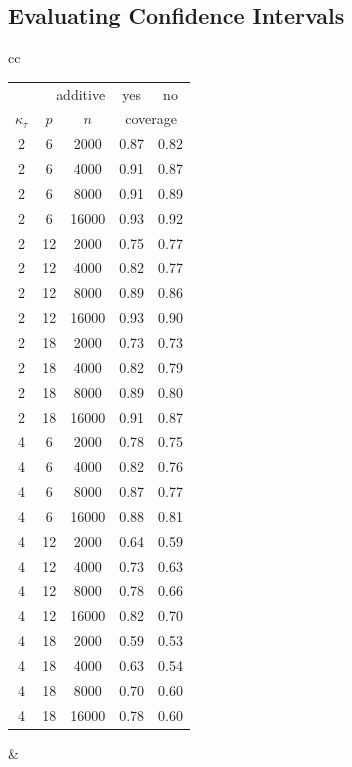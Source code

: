 \documentclass[aos]{imsart}
\theoremstyle{plain}
\theoremstyle{definition}
\theoremstyle{remark}
\begin{document}
\begin{CJK}{UTF8}{gbsn}
\begin{appendix}
\subsection{Evaluating Confidence Intervals}

\begin{table}[t]
\centering
\begin{tabular}{cc}
\begin{tabular}{|ccc|cc|}
\hline
\multicolumn{3}{|r|}{additive} & yes & no \\
$\kappa_\tau$ & $p$ & $n$ & \multicolumn{2}{c|}{coverage} \\ 
  \hline
\hline
2 & 6 & 2000 & 0.87 & 0.82 \\ 
  2 & 6 & 4000 & 0.91 & 0.87 \\ 
  2 & 6 & 8000 & 0.91 & 0.89 \\ 
  2 & 6 & 16000 & 0.93 & 0.92 \\ 
   \hline
2 & 12 & 2000 & 0.75 & 0.77 \\ 
  2 & 12 & 4000 & 0.82 & 0.77 \\ 
  2 & 12 & 8000 & 0.89 & 0.86 \\ 
  2 & 12 & 16000 & 0.93 & 0.90 \\ 
   \hline
2 & 18 & 2000 & 0.73 & 0.73 \\ 
  2 & 18 & 4000 & 0.82 & 0.79 \\ 
  2 & 18 & 8000 & 0.89 & 0.80 \\ 
  2 & 18 & 16000 & 0.91 & 0.87 \\ 
   \hline
\hline
4 & 6 & 2000 & 0.78 & 0.75 \\ 
  4 & 6 & 4000 & 0.82 & 0.76 \\ 
  4 & 6 & 8000 & 0.87 & 0.77 \\ 
  4 & 6 & 16000 & 0.88 & 0.81 \\ 
   \hline
4 & 12 & 2000 & 0.64 & 0.59 \\ 
  4 & 12 & 4000 & 0.73 & 0.63 \\ 
  4 & 12 & 8000 & 0.78 & 0.66 \\ 
  4 & 12 & 16000 & 0.82 & 0.70 \\ 
   \hline
4 & 18 & 2000 & 0.59 & 0.53 \\ 
  4 & 18 & 4000 & 0.63 & 0.54 \\ 
  4 & 18 & 8000 & 0.70 & 0.60 \\ 
  4 & 18 & 16000 & 0.78 & 0.60 \\  
   \hline
\end{tabular}
&
\begin{tabular}{|ccc|cc|}

\end{tabular}
\end{tabular}
\end{table}
\end{appendix}
\end{CJK}
\end{document}
